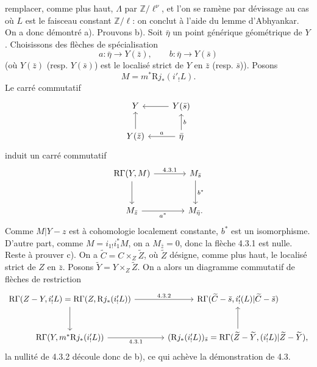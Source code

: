 remplacer, comme plus haut, $\Lambda$ par $\mathbb{Z}/\ell^\nu$, et l'on se ramène par dévissage au cas où $L$ est le faisceau constant $\mathbb{Z}/\ell$: on conclut à l'aide du lemme d'Abhyankar. On a donc démontré a). Prouvons b). Soit $\bar\eta$ un point générique géométrique de $Y$. Choisissons des flèches de spécialisation
\[
a:\bar\eta\to Y(\bar z),\qquad b:\bar\eta\to Y(\bar s)
\]
(où $Y(\bar z)$ (resp. $Y(\bar s)$) est le localisé strict de $Y$ en $\bar z$ (resp. $\bar s$)). Posons
\[
M=m^*\mathrm{R} j_*(i'_!L).
\]
Le carré commutatif
\[
\begin{tikzcd}
Y & Y(\bar s)\arrow[l]\\
Y(\bar z)\arrow[u] & \bar\eta \arrow[l,"a"']\arrow[u,"b"']
\end{tikzcd}
\]
induit un carré commutatif
\[
\begin{tikzcd}[column sep=large,row sep=large]
\mathrm{R}\Gamma(Y,M) \arrow[r,"4.3.1"] \arrow[d] & M_{\bar s} \arrow[d,"b^*"]\\
M_{\bar z} \arrow[r,"a^*"'] & M_{\bar\eta}.
\end{tikzcd}
\]
Comme $M|Y-z$ est à cohomologie localement constante, $b^*$ est un isomorphisme. D'autre part, comme $M=i_{1!}i_1^*M$, on a $M_{\bar z}=0$, donc la flèche 4.3.1 est nulle. Reste à prouver c). On a $\widetilde C=C\times_Z\widetilde Z$, où $\widetilde Z$ désigne, comme plus haut, le localisé strict de $Z$ en $\bar z$. Posons $\widetilde Y=Y\times_Z\widetilde Z$. On a alors un diagramme commutatif de flèches de restriction
\[
\begin{tikzcd}[column sep=large,row sep=large]
\mathrm{R}\Gamma(Z-Y,i'_!L)=\mathrm{R}\Gamma(Z,\mathrm{R} j_*(i'_!L))
 \arrow[r,"4.3.2"] \arrow[d]
&
\mathrm{R}\Gamma(\widetilde C-\bar s,i'_!(L)|\widetilde C-\bar s)\\
\mathrm{R}\Gamma(Y,m^*\mathrm{R} j_*(i'_!L)) \arrow[r,"4.3.1"']
&
(\mathrm{R} j_*(i'_!L))_{\bar s}
  =\mathrm{R}\Gamma(\widetilde Z-\widetilde Y,(i'_!L)|\widetilde Z-\widetilde Y) , \arrow[u]
\end{tikzcd}
\]
la nullité de 4.3.2 découle donc de b), ce qui achève la démonstration de 4.3.

